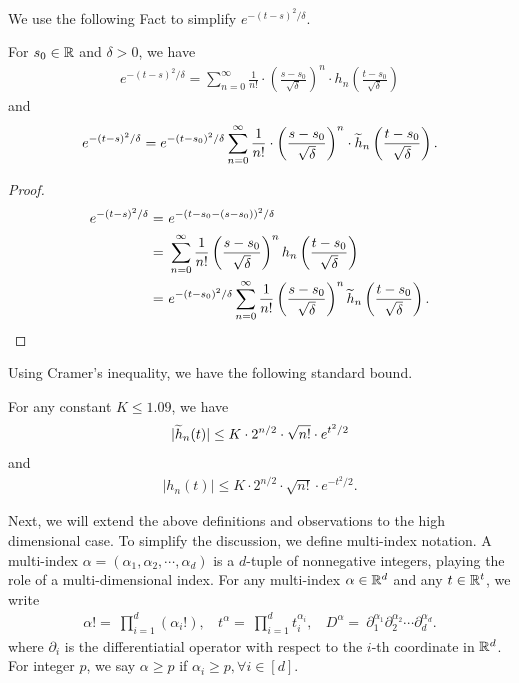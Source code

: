 We use the following Fact to simplify $e^{-(t-s)^2/\delta}$.
\begin{fact}
For $s_0 \in {\mathbb R}$ and $\delta > 0$, we have
\begin{align*}
e^{ - (t-s)^2 / \delta } = \sum_{n=0}^{\infty} \frac{1}{n !} \cdot \left( \frac{ s - s_0 }{ \sqrt{\delta} } \right)^n \cdot h_n \left( \frac{ t - s_0 }{ \sqrt{\delta} } \right)
\end{align*}
and
\begin{align*}
e^{ - (t-s)^2 / \delta } =  e^{ - (t - s_0)^2 / \delta } \sum_{n=0}^{\infty} \frac{1}{n !} \cdot \left( \frac{ s - s_0 }{ \sqrt{\delta} } \right)^n \cdot \widetilde{h}_n \left( \frac{t - s_0}{ \sqrt{\delta} } \right) .
\end{align*}
\end{fact}
\begin{proof}

\begin{align*}
e^{ - (t-s)^2 / \delta } 
= & ~ e^{ - ( t - s_0 - (s - s_0) )^2 / \delta } \\
= & ~ \sum_{n=0}^{\infty} \frac{1}{n !} \left( \frac{ s - s_0 }{ \sqrt{\delta} } \right)^n h_n \left( \frac{ t - s_0 }{ \sqrt{\delta} } \right) \\
= & ~ e^{ - (t - s_0)^2 / \delta } \sum_{n=0}^{\infty} \frac{1}{n !} \left( \frac{ s - s_0 }{ \sqrt{\delta} } \right)^n \widetilde{h}_n \left( \frac{t - s_0}{ \sqrt{\delta} } \right). 
\end{align*}

\end{proof}

Using Cramer's inequality, we have the following standard bound.
\begin{lemma}
For any constant $K \leq 1.09$, we have
\begin{align*}
|\widetilde{h}_n(t) | \leq K \cdot 2^{n/2} \cdot \sqrt{ n !} \cdot e^{t^2 /2}
\end{align*}
and
\begin{align*}
| h_n(t) | \leq K \cdot 2^{n/2} \cdot \sqrt{n !} \cdot e^{-t^2/2} .
\end{align*}
\end{lemma}

Next, we will extend the above definitions and observations to the high dimensional case. To simplify the discussion, we define multi-index notation. A multi-index $\alpha = (\alpha_1,\alpha_2, \cdots, \alpha_d)$ is a $d$-tuple of nonnegative integers, playing the role of a multi-dimensional index. For any multi-index $\alpha \in {\mathbb R}^d$ and any $t\in {\mathbb R}^t$, we write
\begin{align*}
\alpha ! = ~ \prod_{i=1}^d (\alpha_i ! ), ~~~~
t^{\alpha} = ~ \prod_{i=1}^d t_i^{\alpha_i} , ~~~~
D^{\alpha} = ~ \partial_1^{\alpha_1} \partial_2^{\alpha_2} \cdots \partial_d^{\alpha_d} .
\end{align*}
where $\partial_i$ is the differentiatial operator with respect to the $i$-th coordinate in ${\mathbb R}^d$. For integer $p$, we say $\alpha \geq p$ if $\alpha_i \geq p, \forall i \in [d]$.

